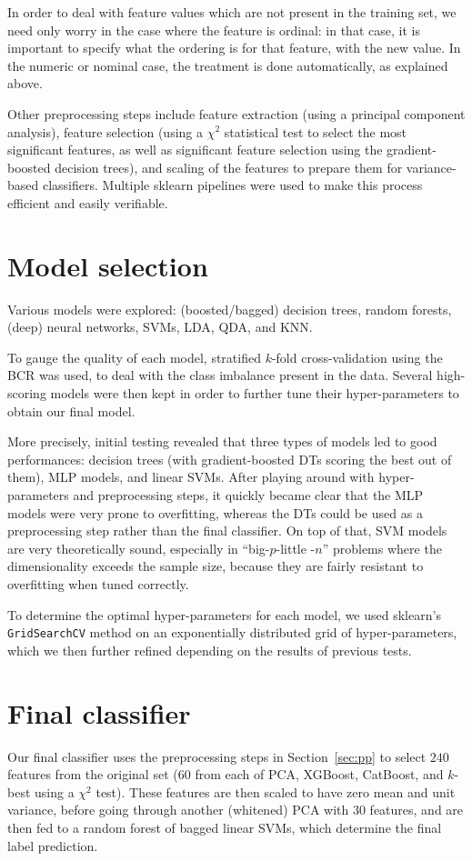 \documentclass{article}
\newcommand{\py}[1]{\texttt{#1}}
\begin{document}
In order to deal with feature values which are not present in the training set, we need only worry in the case where the feature is ordinal: in that case, it is important to specify what the ordering is for that feature, with the new value.
In the numeric or nominal case, the treatment is done automatically, as explained above.

Other preprocessing steps include feature extraction (using a principal component analysis), feature selection (using a \(\chi^2\) statistical test to select the most significant features, as well as significant feature selection using the gradient-boosted decision trees), and scaling of the features to prepare them for variance-based classifiers.
Multiple sklearn pipelines were used to make this process efficient and easily verifiable.

\section{Model selection}
Various models were explored: (boosted/bagged) decision trees, random forests, (deep) neural networks, SVMs, LDA, QDA, and KNN.

To gauge the quality of each model, stratified \(k\)-fold cross-validation using the BCR was used, to deal with the class imbalance present in the data.
Several high-scoring models were then kept in order to further tune their hyper-parameters to obtain our final model.

More precisely, initial testing revealed that three types of models led to good performances: decision trees (with gradient-boosted DTs scoring the best out of them), MLP models, and linear SVMs.
After playing around with hyper-parameters and preprocessing steps, it quickly became clear that the MLP models were very prone to overfitting, whereas the DTs could be used as a preprocessing step rather than the final classifier.
On top of that, SVM models are very theoretically sound, especially in ``big-\(p\)-little -\(n\)'' problems where the dimensionality exceeds the sample size, because they are fairly resistant to overfitting when tuned correctly.

To determine the optimal hyper-parameters for each model, we used sklearn's \py{GridSearchCV} method on an exponentially distributed grid of hyper-parameters, which we then further refined depending on the results of previous tests.

\section{Final classifier}
Our final classifier uses the preprocessing steps in Section~\ref{sec:pp} to select \(240\) features from the original set (\(60\) from each of PCA, XGBoost, CatBoost, and \(k\)-best using a \(\chi^2\) test).
These features are then scaled to have zero mean and unit variance, before going through another (whitened) PCA with \(30\) features, and are then fed to a random forest of bagged linear SVMs, which determine the final label prediction.
\end{document}
